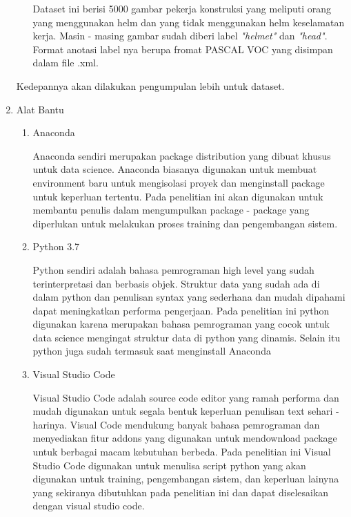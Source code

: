 \begin{enumerate}
\begin{enumerate}
    \par Dataset ini berisi 5000 gambar pekerja konstruksi yang meliputi orang yang menggunakan helm dan yang tidak menggunakan helm keselamatan kerja. Masin - masing gambar sudah diberi label
    \emph{"helmet"} dan \emph{"head"}. Format anotasi label nya berupa fromat PASCAL VOC yang disimpan dalam file .xml.
  \end{enumerate}
  \par Kedepannya akan dilakukan pengumpulan lebih untuk dataset.

  \item Alat Bantu
  \begin{enumerate}
    \item Anaconda
    \par Anaconda sendiri merupakan package distribution yang dibuat khusus untuk data science. Anaconda biasanya digunakan untuk membuat environment baru untuk mengisolasi proyek dan menginstall package untuk keperluan tertentu. Pada penelitian ini akan digunakan untuk membantu penulis dalam mengumpulkan package - package yang diperlukan untuk melakukan proses training dan pengembangan sistem.\cite{pankajmathur_2018}

    \item Python 3.7
    \par Python sendiri adalah bahasa pemrograman high level yang sudah terinterpretasi dan berbasis objek. Struktur data yang sudah ada di dalam python dan penulisan syntax yang sederhana dan mudah dipahami dapat meningkatkan performa pengerjaan. Pada penelitian ini python digunakan karena merupakan bahasa pemrograman yang cocok untuk data science mengingat struktur data di python yang dinamis. Selain itu python juga sudah termasuk saat menginstall Anaconda \cite{python.org}

    \item Visual Studio Code
    \par Visual Studio Code adalah source code editor yang ramah performa dan mudah digunakan untuk segala bentuk keperluan penulisan text sehari - harinya. Visual Code mendukung banyak bahasa pemrograman dan menyediakan fitur addons yang digunakan untuk mendownload package untuk berbagai macam kebutuhan berbeda. Pada penelitian ini Visual Studio Code digunakan untuk menulisa script python yang akan digunakan untuk training, pengembangan sistem, dan keperluan lainyna yang sekiranya dibutuhkan pada penelitian ini dan dapat diselesaikan dengan visual studio code.\cite{microsoft_2021}


\end{enumerate}
\end{enumerate}

